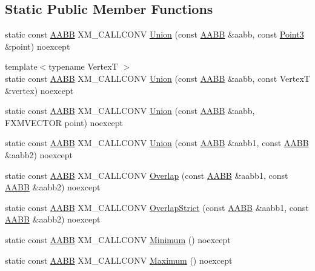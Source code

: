 \subsection*{Static Public Member Functions}
\begin{DoxyCompactItemize}
\item 
static const \mbox{\hyperlink{classmage_1_1_a_a_b_b}{A\+A\+BB}} X\+M\+\_\+\+C\+A\+L\+L\+C\+O\+NV \mbox{\hyperlink{classmage_1_1_a_a_b_b_a24a6669f2ba170b93583bf433cb3e206}{Union}} (const \mbox{\hyperlink{classmage_1_1_a_a_b_b}{A\+A\+BB}} \&aabb, const \mbox{\hyperlink{structmage_1_1_point3}{Point3}} \&point) noexcept
\item 
{\footnotesize template$<$typename VertexT $>$ }\\static const \mbox{\hyperlink{classmage_1_1_a_a_b_b}{A\+A\+BB}} X\+M\+\_\+\+C\+A\+L\+L\+C\+O\+NV \mbox{\hyperlink{classmage_1_1_a_a_b_b_accf101a629c15d27346010c943dda069}{Union}} (const \mbox{\hyperlink{classmage_1_1_a_a_b_b}{A\+A\+BB}} \&aabb, const VertexT \&vertex) noexcept
\item 
static const \mbox{\hyperlink{classmage_1_1_a_a_b_b}{A\+A\+BB}} X\+M\+\_\+\+C\+A\+L\+L\+C\+O\+NV \mbox{\hyperlink{classmage_1_1_a_a_b_b_ac7359d9d73a14c0c26f8caac2a315732}{Union}} (const \mbox{\hyperlink{classmage_1_1_a_a_b_b}{A\+A\+BB}} \&aabb, F\+X\+M\+V\+E\+C\+T\+OR point) noexcept
\item 
static const \mbox{\hyperlink{classmage_1_1_a_a_b_b}{A\+A\+BB}} X\+M\+\_\+\+C\+A\+L\+L\+C\+O\+NV \mbox{\hyperlink{classmage_1_1_a_a_b_b_a96b3e8263d585f01a2f991b2122f8712}{Union}} (const \mbox{\hyperlink{classmage_1_1_a_a_b_b}{A\+A\+BB}} \&aabb1, const \mbox{\hyperlink{classmage_1_1_a_a_b_b}{A\+A\+BB}} \&aabb2) noexcept
\item 
static const \mbox{\hyperlink{classmage_1_1_a_a_b_b}{A\+A\+BB}} X\+M\+\_\+\+C\+A\+L\+L\+C\+O\+NV \mbox{\hyperlink{classmage_1_1_a_a_b_b_a35bf465fbd8571acc2707fa555b9245b}{Overlap}} (const \mbox{\hyperlink{classmage_1_1_a_a_b_b}{A\+A\+BB}} \&aabb1, const \mbox{\hyperlink{classmage_1_1_a_a_b_b}{A\+A\+BB}} \&aabb2) noexcept
\item 
static const \mbox{\hyperlink{classmage_1_1_a_a_b_b}{A\+A\+BB}} X\+M\+\_\+\+C\+A\+L\+L\+C\+O\+NV \mbox{\hyperlink{classmage_1_1_a_a_b_b_a43da3c0b22cd1abb9032d0fb41d4e020}{Overlap\+Strict}} (const \mbox{\hyperlink{classmage_1_1_a_a_b_b}{A\+A\+BB}} \&aabb1, const \mbox{\hyperlink{classmage_1_1_a_a_b_b}{A\+A\+BB}} \&aabb2) noexcept
\item 
static const \mbox{\hyperlink{classmage_1_1_a_a_b_b}{A\+A\+BB}} X\+M\+\_\+\+C\+A\+L\+L\+C\+O\+NV \mbox{\hyperlink{classmage_1_1_a_a_b_b_a9a2a4a236dca8479e208cd0b9ee07b9a}{Minimum}} () noexcept
\item 
static const \mbox{\hyperlink{classmage_1_1_a_a_b_b}{A\+A\+BB}} X\+M\+\_\+\+C\+A\+L\+L\+C\+O\+NV \mbox{\hyperlink{classmage_1_1_a_a_b_b_a72f4f49b07a3816ad74fde9defc8cb76}{Maximum}} () noexcept
\end{DoxyCompactItemize}
